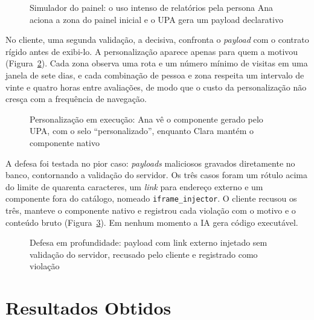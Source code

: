 \begin{figure}[htb]
\centering
\caption{Simulador do painel: o uso intenso de relatórios pela persona Ana aciona a zona do painel inicial e o UPA gera um payload declarativo}
\label{fig:18}
\end{figure}

No cliente, uma segunda validação, a decisiva, confronta o \textit{payload} com o contrato rígido antes de exibi-lo. A personalização aparece apenas para quem a motivou (Figura~\ref{fig:19}). Cada zona observa uma rota e um número mínimo de visitas em uma janela de sete dias, e cada combinação de pessoa e zona respeita um intervalo de vinte e quatro horas entre avaliações, de modo que o custo da personalização não cresça com a frequência de navegação.

\begin{figure}[htb]
\centering
\caption{Personalização em execução: Ana vê o componente gerado pelo UPA, com o selo ``personalizado'', enquanto Clara mantém o componente nativo}
\label{fig:19}
\end{figure}

A defesa foi testada no pior caso: \textit{payloads} maliciosos gravados diretamente no banco, contornando a validação do servidor. Os três casos foram um rótulo acima do limite de quarenta caracteres, um \textit{link} para endereço externo e um componente fora do catálogo, nomeado \texttt{iframe\_injector}. O cliente recusou os três, manteve o componente nativo e registrou cada violação com o motivo e o conteúdo bruto (Figura~\ref{fig:20}). Em nenhum momento a IA gera código executável.

\begin{figure}[htb]
\centering
\caption{Defesa em profundidade: payload com link externo injetado sem validação do servidor, recusado pelo cliente e registrado como violação}
\label{fig:20}
\end{figure}

\section{Resultados Obtidos}\label{sec:5.6}

